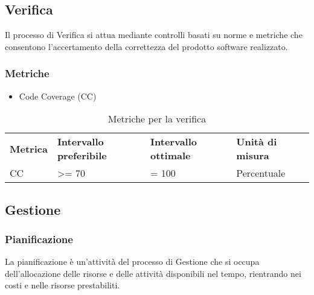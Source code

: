 \subsection{Verifica}
Il processo di Verifica si attua mediante controlli basati su norme e metriche che consentono l'accertamento della correttezza del prodotto software realizzato.
\subsubsection{Metriche}
\begin{itemize}
	\item Code Coverage (CC)
\end{itemize}

\renewcommand{\arraystretch}{2.2}
\begin{longtable}{|C{2.5cm}|C{3.25cm}|C{3.25cm}|C{3cm}|}

	\caption{Metriche per la verifica}\\
	\hline

	\textbf{Metrica} & \textbf{Intervallo preferibile}  & \textbf{Intervallo ottimale} & \textbf{Unità di misura}
	\tabularnewline
	\endfirsthead

	CC & >= 70  & = 100 & Percentuale \\

\end{longtable}


\subsection{Gestione}
\subsubsection{Pianificazione}
La pianificazione è un'attività del processo di Gestione che si occupa dell'allocazione delle risorse e delle attività disponibili nel tempo, rientrando nei costi e nelle risorse prestabiliti.
